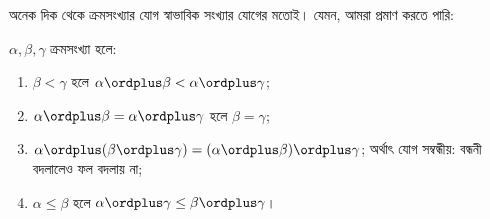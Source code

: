 \documentclass[../../../include/open-logic-section]{subfiles}
\begin{document}
অনেক দিক থেকে ক্রমসংখ্যার যোগ স্বাভাবিক সংখ্যার যোগের
মতোই। যেমন, আমরা প্রমাণ করতে পারি:

\begin{lem}
$\alpha, \beta, \gamma$ ক্রমসংখ্যা হলে:
\begin{enumerate}
	\item{} $\beta < \gamma$ হলে $\alpha
	\ordplus \beta < \alpha \ordplus \gamma$;
	\item{} $\alpha \ordplus \beta =
	\alpha\ordplus \gamma$ হলে $\beta = \gamma$;
	\item{} $\alpha \ordplus (\beta \ordplus
	\gamma) = (\alpha \ordplus \beta) \ordplus \gamma$;
	অর্থাৎ যোগ সম্বন্ধীয়: বন্ধনী বদলালেও ফল বদলায় না;
	\item{} $\alpha \leq \beta$ হলে $\alpha
	\ordplus \gamma \leq \beta \ordplus \gamma$।
\end{enumerate}
\end{lem}
\end{document}
